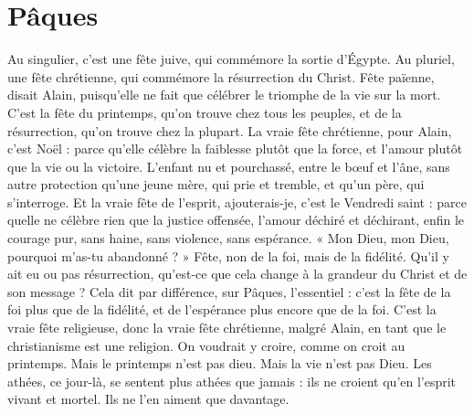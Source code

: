 \section{Pâques}
Au singulier, c’est une fête juive, qui commémore la sortie d'Égypte.
Au pluriel, une fête chrétienne, qui commémore la résurrection du
Christ. Fête païenne, disait Alain, puisqu'elle ne fait que célébrer le triomphe
de la vie sur la mort. C’est la fête du printemps, qu’on trouve chez tous les
peuples, et de la résurrection, qu’on trouve chez la plupart. La vraie fête chrétienne,
pour Alain, c’est Noël : parce qu’elle célèbre la faiblesse plutôt que la
force, et l'amour plutôt que la vie ou la victoire. L'enfant nu et pourchassé,
entre le bœuf et l’âne, sans autre protection qu’une jeune mère, qui prie et
tremble, et qu’un père, qui s'interroge. Et la vraie fête de l'esprit, ajouterais-je,
c'est le Vendredi saint : parce quelle ne célèbre rien que la justice offensée,
l'amour déchiré et déchirant, enfin le courage pur, sans haine, sans violence,
sans espérance. « Mon Dieu, mon Dieu, pourquoi m’as-tu abandonné ? » Fête,
non de la foi, mais de la fidélité. Qu'il y ait eu ou pas résurrection, qu'est-ce
que cela change à la grandeur du Christ et de son message ? Cela dit par différence,
sur Pâques, l'essentiel : c’est la fête de la foi plus que de la fidélité, et de
l'espérance plus encore que de la foi. C’est la vraie fête religieuse, donc la vraie
fête chrétienne, malgré Alain, en tant que le christianisme est une religion. On
voudrait y croire, comme on croit au printemps. Mais le printemps n’est pas
dieu. Mais la vie n’est pas Dieu. Les athées, ce jour-là, se sentent plus athées
que jamais : ils ne croient qu’en l'esprit vivant et mortel. Ils ne l’en aiment que
davantage.

